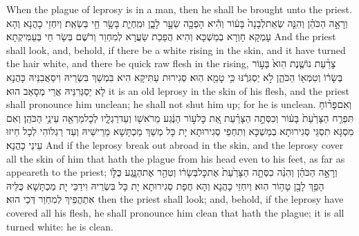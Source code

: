 {When the plague of leprosy is in a man, then he shall be brought unto the priest.}{}
{וְרָאָ֣ה הַכֹּהֵ֗ן וְהִנֵּ֤ה שְׂאֵת\maqqaf לְבָנָה֙ בָּע֔וֹר וְהִ֕יא הָפְכָ֖ה שֵׂעָ֣ר לָבָ֑ן וּמִֽחְיַ֛ת בָּשָׂ֥ר חַ֖י בַּשְׂאֵֽת׃}
{וְיִחְזֵי כָהֲנָא וְהָא עָמְקָא חָוְרָא בְמַשְׁכָּא וְהִיא הֲפַכַת שַׂעֲרָא לְמִחְוַר וְרֹשֶׁם בְּשַׂר חַי בְּעַמִּיקְתָא׃}
{And the priest shall look, and, behold, if there be a white rising in the skin, and it have turned the hair white, and there be quick raw flesh in the rising,}{}
{צָרַ֨עַת נוֹשֶׁ֤נֶת הִוא֙ בְּע֣וֹר בְּשָׂר֔וֹ וְטִמְּא֖וֹ הַכֹּהֵ֑ן לֹ֣א יַסְגִּרֶ֔נּוּ כִּ֥י טָמֵ֖א הֽוּא׃}
{סְגִירוּת עַתִּיקָא הִיא בִּמְשַׁךְ בִּשְׂרֵיהּ וִיסַאֲבִנֵּיהּ כָּהֲנָא לָא יַסְגְּרִנֵּיהּ אֲרֵי מְסָאַב הוּא׃}
{it is an old leprosy in the skin of his flesh, and the priest shall pronounce him unclean; he shall not shut him up; for he is unclean.}{}
{וְאִם\maqqaf פָּר֨וֹחַ תִּפְרַ֤ח הַצָּרַ֙עַת֙ בָּע֔וֹר וְכִסְּתָ֣ה הַצָּרַ֗עַת אֵ֚ת כׇּל\maqqaf ע֣וֹר הַנֶּ֔גַע מֵרֹאשׁ֖וֹ וְעַד\maqqaf רַגְלָ֑יו לְכׇל\maqqaf מַרְאֵ֖ה עֵינֵ֥י הַכֹּהֵֽן׃}
{וְאִם מִסְגָּא תִסְגֵּי סְגִירוּתָא בְמַשְׁכָּא וְתִחְפֵי סְגִירוּתָא יָת כָּל מְשַׁךְ מַכְתָּשָׁא מֵרֵישֵׁיהּ וְעַד רַגְלוֹהִי לְכָל חֵיזוּ עֵינֵי כָהֲנָא׃}
{And if the leprosy break out abroad in the skin, and the leprosy cover all the skin of him that hath the plague from his head even to his feet, as far as appeareth to the priest;}{}
{וְרָאָ֣ה הַכֹּהֵ֗ן וְהִנֵּ֨ה כִסְּתָ֤ה הַצָּרַ֙עַת֙ אֶת\maqqaf כׇּל\maqqaf בְּשָׂר֔וֹ וְטִהַ֖ר אֶת\maqqaf הַנָּ֑גַע כֻּלּ֛וֹ הָפַ֥ךְ לָבָ֖ן טָה֥וֹר הֽוּא׃}
{וְיִחְזֵי כָהֲנָא וְהָא חֲפָת סְגִירוּתָא יָת כָּל בִּשְׂרֵיהּ וִידַכֵּי יָת מַכְתָּשָׁא כֻּלֵּיהּ אִתְהֲפֵיךְ לְמִחְוַר דְּכֵי הוּא׃}
{then the priest shall look; and, behold, if the leprosy have covered all his flesh, he shall pronounce him clean that hath the plague; it is all turned white: he is clean.}{}
